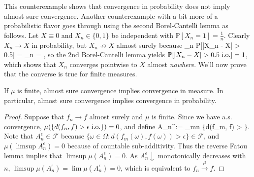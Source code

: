 This counterexample shows that convergence in probability does not imply almost sure convergence. Another counterexample with a bit more of a probabilistic flavor goes through using the second Borel-Cantelli lemma as follows. Let $X\equiv 0$ and $X_n\in \{0, 1\}$ be independent with $\mathbb P[X_n = 1] = \frac{1}{n}$. Clearly $X_n\longrightarrow X$ in probability, but $X_n\not\rightarrow X$ almost surely because 
\eq
	\sum_n \mathbb P[|X_n - X| > 0.5] = \sum_n  = \infty,
\qe
so the 2nd Borel-Cantelli lemma yields $\mathbb P[|X_n - X| > 0.5\;\mathrm{i.o.}] = 1$, which shows that $X_n$ converges pointwise to $X$ almost \textit{nowhere}. We'll now prove that the converse is true for finite measures. 

\begin{theorem}
	If $\mu$ is finite, almost sure convergence implies convergence in measure. In particular, almost sure convergence implies convergence in probability.
\end{theorem}
\begin{proof}
	Suppose that $f_n\longrightarrow f$ almost surely and $\mu$ is finite. Since we have a.s. convergence, $\mu(\{ d(f_n, f) > \epsilon\;\mathrm{i.o.} \}) = 0$, and define
	\eq
		A_n^\epsilon := \bigcup_{m\geq n} \{d(f_m, f) > \epsilon\}.
	\qe
	Note that $A_n^\epsilon\in\mathcal F$ because $\{\omega\in\Omega : d(f_m(\omega), f(\omega)) > \epsilon\}\in\mathcal F$, and $\mu(\limsup A_n^\epsilon) = 0$ because of countable sub-additivity. Thus the reverse Fatou lemma implies that $\limsup \mu(A_n^\epsilon) = 0$. As $A_n^\epsilon\downarrow$ monotonically decreases with $n$, $\limsup \mu(A_n^\epsilon) = \lim\mu(A_n^\epsilon) = 0$, which is equivalent to $f_n\overset{\mu}{\longrightarrow} f$.
\end{proof}

